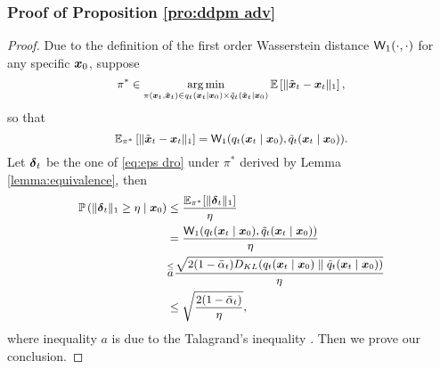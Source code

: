 \subsubsection{Proof of Proposition \ref{pro:ddpm adv}}\label{app:proof of at}
\wtokl*
\begin{proof}
	Due to the definition of the first order Wasserstein distance $\mathsf{W}_{1}(\cdot, \cdot)$ \citep{villani2009optimal} for any specific $\boldsymbol{x}_{0}$, suppose 
	\begin{equation}
		\small
			\pi^{*} \in \operatorname*{arg\,min}_{\pi(\boldsymbol{x}_{t}, \tilde{\boldsymbol{x}}_{t})\in q_{t}(\boldsymbol{x}_{t}\mid \boldsymbol{x}_{0})\times \tilde{q}_{t}(\tilde{\boldsymbol{x}}_{t}\mid \boldsymbol{x}_{0})}\mathbb{E}\left[\|\tilde{\boldsymbol{x}}_{t} - \boldsymbol{x}_{t}\|_{1}\right],
	\end{equation}
	so that 
	\begin{equation}
		\small
			\mathbb{E}_{\pi^{*}}\left[\|\tilde{\boldsymbol{x}}_{t} - \boldsymbol{x}_{t}\|_{1}\right] = \mathsf{W}_{1}(q_{t}(\boldsymbol{x}_{t}\mid \boldsymbol{x}_{0}), \tilde{q}_{t}(\boldsymbol{x}_{t}\mid \boldsymbol{x}_{0})). 
	\end{equation}
	Let $\boldsymbol{\delta}_{t}$ be the one of \eqref{eq:eps dro} under $\pi^{*}$ derived by Lemma \ref{lemma:equivalence}, then 
	\begin{equation}
		\small
		\begin{aligned}
			\mathbb{P}\left(\|\boldsymbol{\delta}_{t}\|_{1} \geq \eta\mid \boldsymbol{x}_{0}\right) & \leq \frac{\mathbb{E}_{\pi^{*}}[\|\boldsymbol{\delta}_{t}\|_{1}]}{\eta}\\
			& = \frac{\mathsf{W}_{1}(q_{t}(\boldsymbol{x}_{t}\mid \boldsymbol{x}_{0}), \tilde{q}_{t}(\boldsymbol{x}_{t}\mid \boldsymbol{x}_{0}))}{\eta} \\
			& \overset{\leq}{a} \frac{\sqrt{2(1 - \bar{\alpha}_{t})D_{KL}(q_{t}(\boldsymbol{x}_{t}\mid \boldsymbol{x}_{0})\parallel \tilde{q}_{t}(\boldsymbol{x}_{t}\mid \boldsymbol{x}_{0}))}}{\eta} \\
			& \leq \sqrt{\frac{2(1 - \bar{\alpha}_{t})}{\eta}},
		\end{aligned}
	\end{equation}
	where inequality $a$ is due to the Talagrand’s inequality \citep{wainwright2019high}. Then we prove our conclusion. 
\end{proof}


